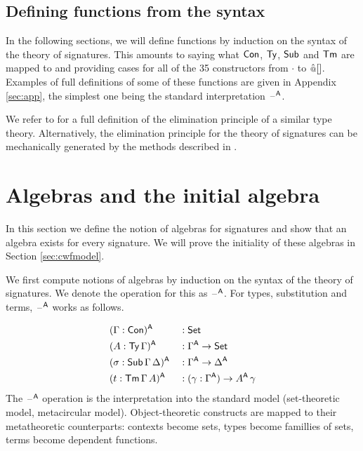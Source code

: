 \documentclass[acmsmall,review,anonymous]{acmart}\settopmatter{printfolios=true,printccs=false,printacmref=false}
\begin{document}
\subsection{Defining functions from the syntax}
\label{sec:syntaxfunctions}

In the following sections, we will define functions by induction on
the syntax of the theory of signatures. This amounts to saying what
$\mathsf{Con}$, $\mathsf{Ty}$, $\mathsf{Sub}$ and $\mathsf{Tm}$ are mapped to and providing cases for
all of the 35 constructors from $\cdot$ to ${\mathop{\hat{\mathop{{\scriptstyle @}}}}[]}$. Examples of
full definitions of some of these functions are given in Appendix
\ref{sec:app}, the simplest one being the standard interpretation
$\mathord{\hspace{1pt}\text{--}\hspace{1pt}}^{\mathsf{A}}$.

We refer to \cite{ttintt} for a full definition of the elimination
principle of a similar type theory. Alternatively, the elimination
principle for the theory of signatures can be mechanically generated
by the methods described in \cite{kaposi_et_al:LIPIcs:2018:9190}.


\section{Algebras and the initial algebra}
\label{sec:algebras}

In this section we define the notion of algebras for signatures and
show that an algebra exists for every signature. We will prove
the initiality of these algebras in Section \ref{sec:cwfmodel}.

We first compute notions of algebras by induction on the syntax of the
theory of signatures. We denote the operation for this as $\mathord{\hspace{1pt}\text{--}\hspace{1pt}}^{\mathsf{A}}$.
For types, substitution and terms, $\mathord{\hspace{1pt}\text{--}\hspace{1pt}}^{\mathsf{A}}$ works as follows.

\begin{alignat*}{5}
  & (\Gamma:\mathsf{Con})^{\mathsf{A}} && : \mathsf{Set} \\
  & (A:\mathsf{Ty}\,\Gamma)^{\mathsf{A}} && : \Gamma^{\mathsf{A}}\rightarrow\mathsf{Set} \\
  & (\sigma:\mathsf{Sub}\,\Gamma\,\Delta)^{\mathsf{A}} && : \Gamma^{\mathsf{A}}\rightarrow\Delta^{\mathsf{A}} \\
  & (t:\mathsf{Tm}\,\Gamma\,A)^{\mathsf{A}} && : (\gamma:\Gamma^{\mathsf{A}})\rightarrow A^{\mathsf{A}}\,\gamma
\end{alignat*}
The $\mathord{\hspace{1pt}\text{--}\hspace{1pt}}^{\mathsf{A}}$ operation is the interpretation into the standard
model (set-theoretic model, metacircular model). Object-theoretic
constructs are mapped to their metatheoretic counterparts: contexts
become sets, types become famillies of sets, terms become dependent
functions.
\end{document}
